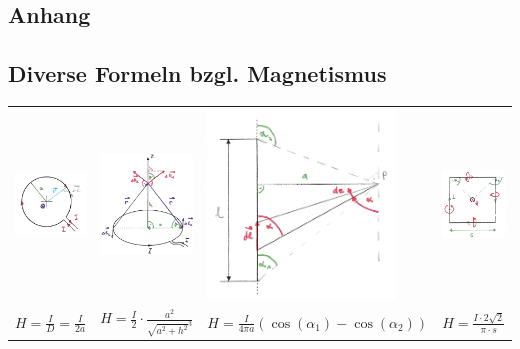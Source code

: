 \begin{landscape}
\section{Anhang}
\subsection{Diverse Formeln bzgl. Magnetismus} \label{seich}
\begin{tabular}{llll}
  \includegraphics[width=5.7cm]{./pics/biot1.png} &
  \includegraphics[width=5.7cm]{./pics/biot2.png} &
  \includegraphics[width=5cm]{./pics/biot3.png} &
  \includegraphics[width=5.7cm]{./pics/biot4.png} \\
  $H =\frac{I}{D} = \frac{I}{2a}$ &
  $H=\frac{I}{2} \cdot \frac{a^2}{\sqrt{a^2+h^2}^3}$ &
  $H=\frac{I}{4\pi a}(\cos(\alpha_1)- \cos(\alpha_2))$ &
  $H= \frac{I \cdot 2 \sqrt{2}}{\pi \cdot s}$ \\
\end{tabular}


\end{landscape}
